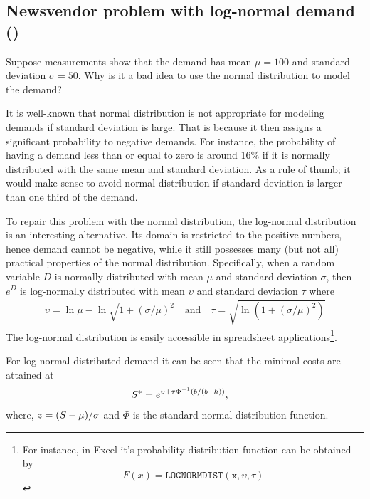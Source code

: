 \subsection{Newsvendor problem with log-normal demand (\faRocket)}

\begin{exercise}
Suppose measurements show that the demand has mean $\mu=100$ and standard deviation $\sigma=50$. Why is it a bad idea to use the normal distribution to model the demand?
\begin{solution}
It is well-known that normal distribution is not appropriate for modeling demands if standard deviation is large. That is because it then assigns a significant probability to negative demands. For instance, the probability of having a demand less than or equal to zero is around 16\% if it is normally distributed with the same mean and standard deviation. As a rule of thumb; it would make sense to avoid normal distribution if standard deviation is larger than one third of the demand. 
\end{solution}
\end{exercise}

To repair this problem with the normal distribution, the log-normal distribution is an interesting alternative.  Its domain is restricted to the positive numbers, hence demand cannot be negative,  while it still possesses many (but not all) practical properties of the normal distribution. Specifically, when a random variable $D$ is normally distributed with mean $\mu$ and standard deviation $\sigma$, then $e^D$ is log-normally distributed with mean $\upsilon$ and standard deviation $\tau$ where 
\begin{align*}
\upsilon = \ln \mu - \ln \sqrt{1+(\sigma/\mu)^2} \quad \text{and} \quad \tau = \sqrt{\ln(1+(\sigma/\mu)^2)}
\end{align*}
The log-normal distribution is easily accessible in spreadsheet applications\footnote{For instance, in Excel it's probability distribution function can be obtained by
\begin{equation*}
F(x)=\mathtt{LOGNORMDIST(x,\upsilon,\tau)} 
\end{equation*}
}.


For log-normal distributed demand it can be seen that the minimal costs are attained at
\begin{align*}
S^* & =e^{\upsilon + \tau \Phi^{-1}(b/(b+h))},
\end{align*}
where, $z=(S-\mu)/\sigma$ and $\Phi$ is the standard normal distribution function.


